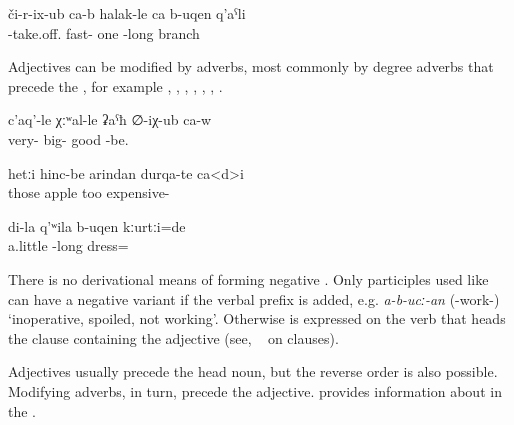 \begin{exe}
	\ex	\label{ex:He immediately broke one long branch (off a tree)}
	\gll	či-r-ix-ub	ca-b	halak-le	ca	b-uqen	q'aˁli \\
		-take.off.		fast-	one	-long	branch \\
	\glt	{}
\end{exe}

Adjectives can be modified by adverbs, most commonly by degree adverbs that precede the , for example  ,  ,   ,  ,   ,  ,   . 

\begin{exe}
	\ex	\label{ex:He was very very good}
	\gll	c'aq'-le	χːʷal-le	ʡaˁħ	∅-iχ-ub ca-w \\
		very-	big-	good	-be.  \\
	\glt	{}

	\ex	\label{ex:The apples are too expensive}
	\gll	hetːi	hinc-be	arindan	durqa-te	ca<d>i \\
		those	apple	too	expensive- 	\\
	\glt	{}

	\ex	\label{ex:My shirt was a bit long}
	\gll	di-la	q'ʷila	b-uqen	kːurtːi=de \\
			a.little	-long	dress= \\
	\glt	{}
\end{exe}

There is no derivational means of forming negative . Only participles used like  can have a negative variant if the verbal  prefix  is added, e.g. \textit{a-b-ucː-an} (-work-) `inoperative, spoiled, not working'. Otherwise  is expressed on the verb that heads the clause containing the adjective (see, \teg\  on  clauses).

Adjectives usually precede the head noun, but the reverse order is also possible. Modifying adverbs, in turn, precede the adjective.  provides information about  in the .


